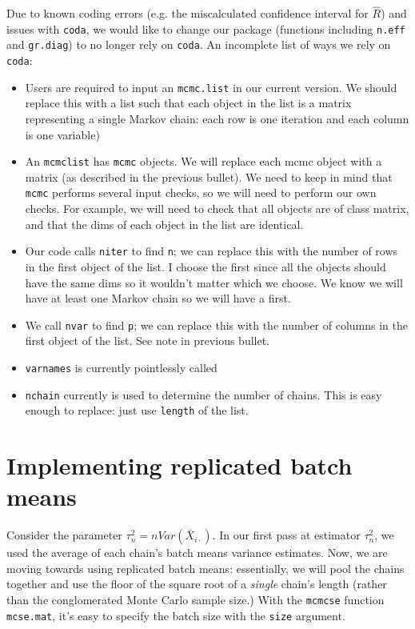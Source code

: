 \documentclass[12pt]{article}
\theoremstyle{remark}
\begin{document}
Due to known coding errors (e.g. the miscalculated confidence interval for $\hat{R}$) and issues with \texttt{coda}, we would like to change our package (functions including \texttt{n.eff} and \texttt{gr.diag}) to no longer rely on \texttt{coda}. An incomplete list of ways we rely on  \texttt{coda}: 

\begin{itemize}
 \renewcommand{\labelitemi}{$\blacksquare$}
\item Users are required to input an \texttt{mcmc.list} in our current version. We should replace this with a list such that each object in the list is a matrix representing a single Markov chain: each row is one iteration and each column is one variable)
\item An \texttt{mcmclist} has \texttt{mcmc} objects. We will replace each mcmc object with a matrix (as described in the previous bullet). We need to keep in mind that \texttt{mcmc} performs several input checks, so we will need to perform our own checks. For example, we will need to check that all objects are of class matrix, and that the dims of each object in the list are identical. 

\item Our code calls \texttt{niter} to find \texttt{n}; we can replace this with the number of rows in the first object of the list. I choose the first since all the objects should have the same dims so it wouldn't matter which we choose. We know we will have at least one Markov chain so we will have a first.
\item We call \texttt{nvar} to find \texttt{p}; we can replace this with the number of columns in the first object of the list. See note in previous bullet.
\item \texttt{varnames} is currently pointlessly called
\item \texttt{nchain} currently is used to determine the number of chains. This is easy enough to replace: just use \texttt{length} of the list.
\end{itemize}



\section{\textbf{Implementing replicated batch means}}

Consider the parameter $\tau^2_n = nVar(\bar{X}_{i\cdot})$. In our first pass at estimator $\tau^2_n$, we used the average of each chain's batch means variance estimates. Now, we are moving towards using replicated batch means: essentially, we will pool the chains together and use the floor of the square root of a \textit{single} chain's length (rather than the conglomerated Monte Carlo sample size.)  With the \texttt{mcmcse} function \texttt{mcse.mat}, it's easy to specify the batch size with the \texttt{size} argument.\\
\end{document}

